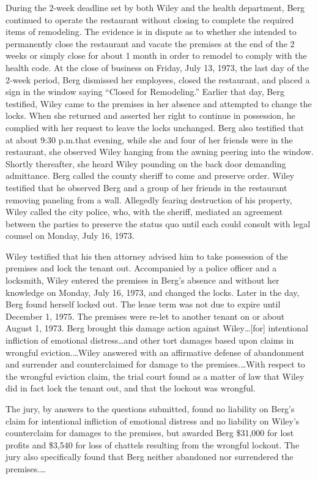 During the 2-week deadline set by both Wiley and the
health department, Berg continued to operate the
restaurant without closing to complete the required items of remodeling. The
evidence is in dispute as to whether she intended to permanently close the
restaurant and vacate the premises at the end of the 2 weeks or simply close
for about 1 month in order to remodel to comply with the health code. At the
close of business on Friday, July 13, 1973, the last day of the 2-week period,
Berg dismissed her employees, closed the restaurant,
and placed a sign in the window saying ``Closed for Remodeling.'' Earlier that
day, Berg testified, Wiley came
to the premises in her absence and attempted to change the locks. When she
returned and asserted her right to continue in possession, he complied with her
request to leave the locks unchanged. Berg also
testified that at about 9:30 p.m.\@ that evening, while she and four of her
friends were in the restaurant, she observed Wiley
hanging from the awning peering into the window. Shortly thereafter, she heard
Wiley pounding on the back door demanding admittance.
Berg called the county sheriff to come and preserve
order. Wiley testified that he observed
Berg and a group of her friends in the restaurant
removing paneling from a wall. Allegedly fearing destruction of his property,
Wiley called the city police, who, with the sheriff,
mediated an agreement between the parties to preserve the status quo until each
could consult with legal counsel on Monday, July 16, 1973.

Wiley testified that his then attorney advised him to
take possession of the premises and lock the tenant out. Accompanied by a
police officer and a locksmith, Wiley entered the
premises in Berg's absence and without her knowledge on
Monday, July 16, 1973, and changed the locks. Later in the day,
Berg found herself locked out. The lease term was not
due to expire until December 1, 1975. The premises were re-let to another
tenant on or about August 1, 1973. Berg brought this
damage action against Wiley\ldots [for] intentional
infliction of emotional distress\ldots and other tort damages based upon claims
in wrongful eviction.\ldots Wiley answered with an
affirmative defense of abandonment and surrender and counterclaimed for damage
to the premises.\ldots With respect to the wrongful eviction claim, the trial
court found as a matter of law that Wiley did in fact
lock the tenant out, and that the lockout was wrongful.

The jury, by answers to the questions submitted, found no liability on
Berg's claim for intentional infliction of emotional
distress and no liability on Wiley's counterclaim for
damages to the premises, but awarded Berg \$31,000 for
lost profits and \$3,540 for loss of chattels resulting from the wrongful
lockout. The jury also specifically found that Berg
neither abandoned nor surrendered the premises.\ldots 

